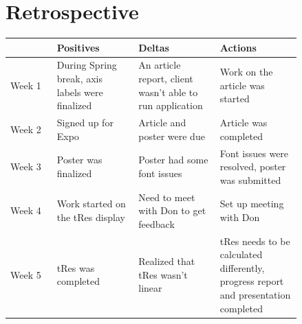 \documentclass[onecolumn, draftclsnofoot,10pt, compsoc]{IEEEtran}
\begin{document}
\section{Retrospective}
\begin{center}
	\begin{longtable}{| l | p{0.28\linewidth} | p{0.28\linewidth} | p{0.28\linewidth} |}
		\hline
		& Positives & Deltas & Actions \\ \hline
    Week 1 & During Spring break, axis labels were finalized & An article report, client wasn't able to run application & Work on the article was started \\ \hline
	Week 2 & Signed up for Expo & Article and poster were due & Article was completed \\ \hline
	Week 3 & Poster was finalized & Poster had some font issues & Font issues were resolved, poster was submitted \\ \hline
	Week 4 & Work started on the tRes display & Need to meet with Don to get feedback & Set up meeting with Don \\ \hline
  Week 5 & tRes was completed & Realized that tRes wasn't linear & tRes needs to be calculated differently, progress report and presentation completed \\ \hline
\end{longtable}
\end{center}

\newpage


\end{document}
